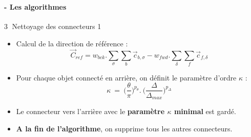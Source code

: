 \documentclass[8pt]{beamer}
\begin{document}
  
  \begin{frame}
  \frametitle{\secname}
  \framesubtitle{\subsecname - Les algorithmes}
    \begin{minipage}{0.55\linewidth}
      \begin{block}{\textcircled{{\small 3}} Nettoyage des connecteurs 1}
         \\
        \begin{itemize}
          \item<3-> Calcul de la direction de référence :
          \begin{equation}
            \vec{C}_{ref} = w_{bck} . \sum_\sigma \sum_b \vec{c}_{b,\sigma} - w_{fwd} . \sum_\delta \sum_f \vec{c}_{f,\delta}
          \end{equation}
          \item<4-> Pour chaque objet connecté en arrière, on définit le paramètre d'ordre $\kappa$ :
          \begin{equation}
            \kappa~=~\Big(\frac{\theta}{\pi}\Big)^{p_{\theta}} . ~\Big(\frac{\Delta}{\Delta_{max}}\Big)^{p_{\Delta}} 
          \end{equation}
          \item<5-> Le connecteur vers l'arrière avec le \textbf{paramètre $\kappa$ minimal} est gardé. 
          \item<6-> \textbf{A la fin de l'algorithme}, on supprime tous les autres connecteurs. \\
        \end{itemize}
      \end{block}
    \end{minipage} \hfill
    \begin{minipage}{0.3\linewidth}
      \begin{center}
      \end{center}
    \end{minipage}
  \end{frame}
  
\end{document}
